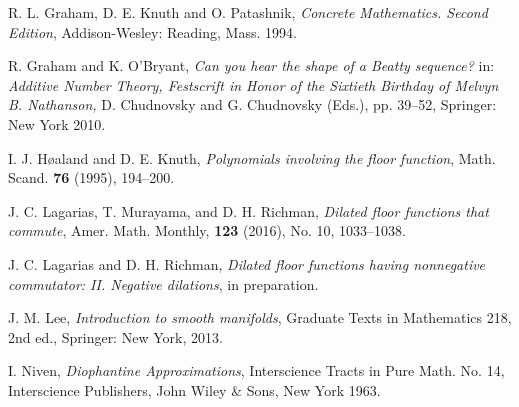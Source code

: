 \documentclass[11pt, letterpaper, reqno]{amsart}
\theoremstyle{definition}
\numberwithin{equation}{section}
\begin{document}
{\begin{thebibliography}{99}
R. L. Graham, D. E. Knuth and O. Patashnik,
\emph{Concrete Mathematics. Second Edition},
Addison-Wesley: Reading, Mass. 1994.



R. Graham and K. O'Bryant,
\emph{Can you hear the shape of a Beatty sequence?}
in: {\em Additive Number Theory, Festscrift in Honor of the Sixtieth Birthday
of Melvyn B. Nathanson,} D. Chudnovsky and G. Chudnovsky (Eds.),
pp. 39--52, Springer: New York 2010. 

 
 
I. J. H\o{a}land and D. E. Knuth,
\emph{Polynomials involving the floor function},
Math. Scand. {\bf 76} (1995), 194--200.

J. C. Lagarias, T. Murayama, and D. H. Richman,
\emph{Dilated floor functions that commute},
Amer. Math. Monthly, {\bf 123} (2016), No. 10, 1033--1038.
 
J. C. Lagarias and D. H. Richman,
\emph{Dilated floor functions having nonnegative commutator: II. Negative dilations},
 in preparation.
 
 
J. M. Lee, 
\emph{Introduction to smooth manifolds},
{Graduate Texts in Mathematics}
{218},
{2nd ed.},
{Springer: New York},
{2013}.


 
I. Niven,
\emph{Diophantine Approximations},
Interscience Tracts in Pure Math. No. 14, Interscience Publishers,
John Wiley \& Sons, New York 1963.
 

\end{thebibliography}}
\end{document}
